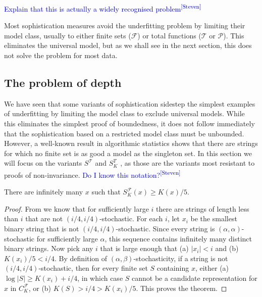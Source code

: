 \documentclass{style/llncs}
\newcommand{\T}{\mathscr T}
\newcommand{\F}{\mathscr F}
\renewcommand{\P}{\mathscr P}
\newcommand{\sdr}[1]{\textcolor{blue}{\small #1\textsuperscript{[Steven]} }}
\begin{document}
\sdr{Explain that this is actually a widely recognised problem}

Most sophistication measures avoid the underfitting problem by limiting their model class, usually to either finite sets ($\F$) or total functions ($\T$ or $\P$). This eliminates the universal model, but as we shall see in the next section, this does not solve the problem for most data. 

\subsection{The problem of depth}

We have seen that some variants of sophistication sidestep the simplest examples of underfitting by limiting the model class to exclude universal models. While this eliminates the simplest proof of boundedness, it does not follow immediately that the sophistication based on a restricted model class must be unbounded. However, a well-known result in algorithmic statistics shows that there are strings for which no finite set is as good a model as the singleton set. In this section we will focus on the variants $S^\T$ and $S^T_K$ \cite{vitanyi2004meaningful}, as those are the variants most resistant to proofs of non-invariance. \sdr{Do I know this notation?}

\begin{lemma}
There are infinitely many $x$ such that $S^\F_K(x) \geq K(x)/5$. \label{lemma:structure-function-is-not-bounded}
\end{lemma}
\begin{proof}
From \cite[Proposition~I.3 (b)]{gacs2001algorithmic} we know that for sufficiently large $i$ there are strings of length less than $i$ that are not $(i/4, i/4)$-stochastic. For each $i$, let $x_i$ be the smallest binary string that is not $(i/4, i/4)$-stochastic. Since every string is $(\alpha,\alpha)$-stochastic for sufficiently large $\alpha$, this sequence contains infinitely many distinct binary strings. Now pick any $i$ that is large enough that (a) $|x_i|<i$ and (b) $K(x_i)/5 < i/4$. By definition of $(\alpha,\beta)$-stochasticity, if a string is not $(i/4,i/4)$-stochastic, then for every finite set $S$ containing $x$, either (a) $\log|S|\ge K(x_i)+i/4$, in which case $S$ cannot be a candidate representation for $x$ in $C^\F_K$, or (b) $K(S)>i/4>K(x_i)/5$. This proves the theorem.
\end{proof}
\end{document}
